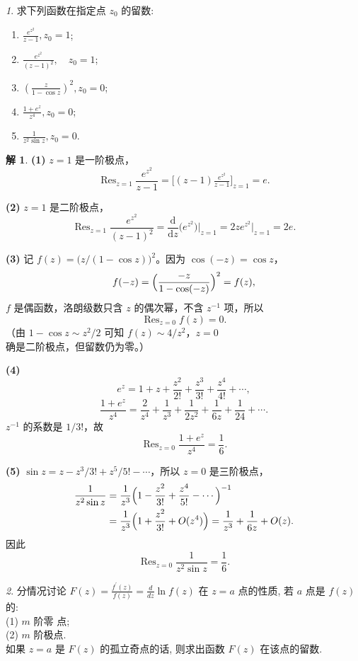 \documentclass[11pt]{article}
\newcommand{\Res}{\operatorname{Res}}
\theoremstyle{remark}
\newtheorem{problem}{}
\theoremstyle{definition}
\newtheorem{solution}{解}
\begin{document}
\begin{problem}
 求下列函数在指定点 $z_0$ 的留数:

 \begin{enumerate}
  \item  $\frac{e^{z^2}}{z-1}, z_0=1$;
  \item $\frac{e^{z^2}}{(z-1)^2}, \quad z_0=1$;
  \item $\left(\frac{z}{1-\cos z}\right)^2, z_0=0$;
  \item  $\frac{1+e^z}{z^4}, z_0=0$;
  \item $\frac{1}{z^2 \sin z}, z_0=0$.
 \end{enumerate}
\end{problem}

\begin{solution}
\textbf{(1)}
$z=1$ 是一阶极点，
\[
\Res_{z=1}\frac{e^{z^{2}}}{z-1}
=\bigl[(z-1)\tfrac{e^{z^{2}}}{z-1}\bigr]_{z=1}
=e.
\]

\textbf{(2)}
$z=1$ 是二阶极点，
\[
\Res_{z=1}\frac{e^{z^{2}}}{(z-1)^{2}}
=\frac{\mathrm{d}}{\mathrm{d}z}\bigl(e^{z^{2}}\bigr)\bigg|_{z=1}
=2ze^{z^{2}}\big|_{z=1}
=2e.
\]

\textbf{(3)}
记 $f(z)=\bigl(z/(1-\cos z)\bigr)^{2}$。因为 $\cos(-z)=\cos z$，
\[
f(-z)=\Bigl(\frac{-z}{1-\cos(-z)}\Bigr)^{2}=f(z),
\]
$f$ 是偶函数，洛朗级数只含 $z$ 的偶次幂，不含 $z^{-1}$ 项，所以
\[
\Res_{z=0}f(z)=0.
\]
（由 $1-\cos z\sim z^{2}/2$ 可知 $f(z)\sim 4/z^{2}$，$z=0$ 确是二阶极点，但留数仍为零。）

\textbf{(4)}
\[
e^{z}=1+z+\frac{z^{2}}{2!}+\frac{z^{3}}{3!}+\frac{z^{4}}{4!}+\cdots,
\]
\[
\frac{1+e^{z}}{z^{4}}
=\frac{2}{z^{4}}+\frac{1}{z^{3}}+\frac{1}{2z^{2}}+\frac{1}{6z}+\frac{1}{24}+\cdots.
\]
$z^{-1}$ 的系数是 $1/3!$，故
\[
\Res_{z=0}\frac{1+e^{z}}{z^{4}}=\frac16.
\]

\textbf{(5)}
$\sin z=z-z^{3}/3!+z^{5}/5!-\cdots$，所以 $z=0$ 是三阶极点，
\begin{align*}
\frac{1}{z^{2}\sin z}
&=\frac{1}{z^{3}}\Bigl(1-\frac{z^{2}}{3!}+\frac{z^{4}}{5!}-\cdots\Bigr)^{-1}\\
&=\frac{1}{z^{3}}\Bigl(1+\frac{z^{2}}{3!}+O(z^{4})\Bigr)
=\frac{1}{z^{3}}+\frac{1}{6z}+O(z).
\end{align*}
因此
\[
\Res_{z=0}\frac{1}{z^{2}\sin z}=\frac16.
\]
\end{solution}

\begin{problem}
分情况讨论 $F(z)=\frac{f^{\prime}(z)}{f(z)}=\frac{d}{d z} \ln f(z)$ 在 $z=a$ 点的性质, 
  若 $a$ 点是 $f(z)$ 的: 
  \\
  (1) $m$ 阶零 点; 
  \\
  (2) $m$ 阶极点.
  \\
  如果 $z=a$ 是 $F(z)$ 的孤立奇点的话, 则求出函数 $F(z)$ 在该点的留数.
\end{problem}
\end{document}
